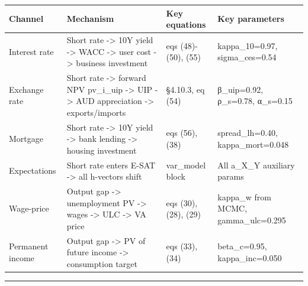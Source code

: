 \documentclass[
]{article}
\newcounter{none} %
\begin{document}
{\def\LTcaptype{none} %
\begin{longtable}[]{@{}
  >{\raggedright\arraybackslash}p{}
  >{\raggedright\arraybackslash}p{}
  >{\raggedright\arraybackslash}p{}
  >{\raggedright\arraybackslash}p{}@{}}
\toprule\noalign{}
\begin{minipage}[b]{\linewidth}\raggedright
Channel
\end{minipage} & \begin{minipage}[b]{\linewidth}\raggedright
Mechanism
\end{minipage} & \begin{minipage}[b]{\linewidth}\raggedright
Key equations
\end{minipage} & \begin{minipage}[b]{\linewidth}\raggedright
Key parameters
\end{minipage} \\
\midrule\noalign{}
\endhead
\bottomrule\noalign{}
\endlastfoot
Interest rate & Short rate -\textgreater{} 10Y yield -\textgreater{}
WACC -\textgreater{} user cost -\textgreater{} business investment & eqs
(48)-(50), (55) & kappa\_10=0.97, sigma\_ces=0.54 \\
Exchange rate & Short rate -\textgreater{} forward NPV pv\_i\_uip
-\textgreater{} UIP -\textgreater{} AUD appreciation -\textgreater{}
exports/imports & §4.10.3, eq (54) & β\_uip=0.92, ρ\_s=0.78,
α\_s=0.15 \\
Mortgage & Short rate -\textgreater{} 10Y yield -\textgreater{} bank
lending -\textgreater{} housing investment & eqs (56), (38) &
spread\_lh=0.40, kappa\_mort=0.048 \\
Expectations & Short rate enters E-SAT -\textgreater{} all h-vectors
shift & var\_model block & All a\_X\_Y auxiliary params \\
Wage-price & Output gap -\textgreater{} unemployment PV -\textgreater{}
wages -\textgreater{} ULC -\textgreater{} VA price & eqs (30), (28),
(29) & kappa\_w from MCMC, gamma\_ulc=0.295 \\
Permanent income & Output gap -\textgreater{} PV of future income
-\textgreater{} consumption target & eqs (33), (34) & beta\_c=0.95,
kappa\_inc=0.050 \\
\end{longtable}
}

\begin{center}\rule{0.5\linewidth}{0.5pt}\end{center}
\end{document}
